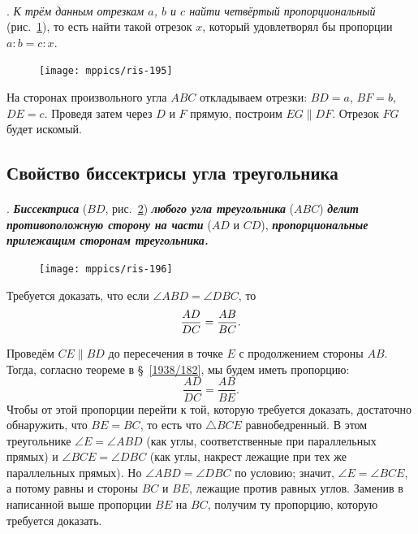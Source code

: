 \documentclass[oneside]{book}
\begin{document}
\paragraph{}\label{1938/185}
.
\emph{К трём данным отрезкам $a$, $b$ и $c$ найти четвёртый пропорциональный} (рис.~\ref{1938/ris-195}), то есть
найти такой отрезок $x$, который удовлетворял бы пропорции $a:b=c:x$.

\begin{figure}[h!]
\centering
\texttt{[image: mppics/ris-195]}
\caption{}\label{1938/ris-195}
\end{figure}

На сторонах произвольного угла $ABC$ откладываем отрезки:
$BD=a$, $BF=b$, $DE=c$.
Проведя затем через $D$ и $F$ прямую, построим $EG\parallel DF$.
Отрезок $FG$ будет искомый.

\subsection*{Свойство биссектрисы угла треугольника}

\paragraph{}\label{1938/186}
.
\textbf{\emph{Биссектриса}} ($BD$, рис.~\ref{1938/ris-196}) \textbf{\emph{любого угла треугольника}} ($ABC$) \textbf{\emph{делит противоположную сторону на части}} ($AD$ и $CD$), \textbf{\emph{пропорциональные прилежащим сторонам треугольника.}}

\begin{figure}
\centering
\texttt{[image: mppics/ris-196]}
\caption{}\label{1938/ris-196}
\end{figure}

Требуется доказать, что если $\angle ABD=\angle DBC$, то 
\[\frac{AD}{DC}\z=\frac{AB}{BC}.\]

Проведём $CE \parallel BD$ до пересечения в точке $E$ с продолжением стороны $AB$.
Тогда, согласно теореме в §~\ref{1938/182}, мы будем иметь пропорцию:
\[\frac{AD}{DC}=\frac{AB}{BE}.\]
Чтобы от этой пропорции перейти к той, которую требуется доказать, достаточно обнаружить, что $BE=BC$, то есть что $\triangle BCE$ равнобедренный.
В этом треугольнике $\angle E=\angle ABD$ (как углы, соответственные при параллельных прямых) и $\angle BCE = \angle DBC$ (как углы, накрест лежащие при тех же параллельных прямых).
Но $\angle ABD=\angle DBC$ по условию;
значит, $\angle E = \angle BCE$, а потому равны и стороны $BC$ и $BE$, лежащие против равных углов.
Заменив в написанной выше пропорции $BE$ на $BC$, получим ту пропорцию, которую требуется доказать.
\end{document}

